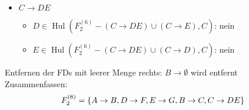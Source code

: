 \documentclass{article}
\DeclareMathOperator{\Hul}{Hul}
\begin{document}
\begin{enumerate}[label=(\alph*)]
\begin{itemize}
\begin{itemize}
			\end{itemize}
			\item $C\to DE$
			\begin{itemize}
				\item $D\in\Hul(F_2^{(6)} - (C\to DE) \cup (C\to E), C)$: nein
				\item $E\in\Hul(F_2^{(6)} - (C\to DE) \cup (C\to D), C)$: nein
			\end{itemize}
		\end{itemize}
		Entfernen der FDs mit leerer Menge rechts: $B\to\emptyset$ wird entfernt \\
		Zusammenfassen:
		\begin{align}
			F_2^{(6)} = \{A\to B, D\to F, E\to G, B\to C, C\to DE\} \notag
		\end{align}
	\end{enumerate}
\end{document}
